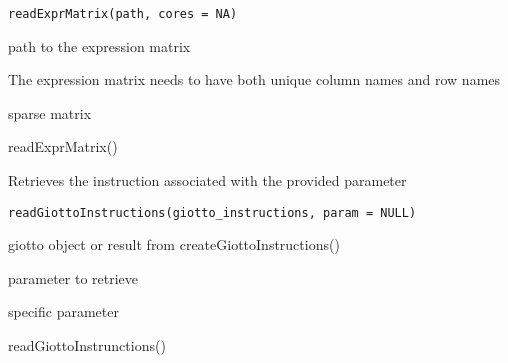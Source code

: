 \documentclass[a4paper]{book}
\begin{document}
%
\begin{Usage}
\begin{verbatim}
readExprMatrix(path, cores = NA)
\end{verbatim}
\end{Usage}
%
\begin{Arguments}
\begin{ldescription}
\item[\code{path}] path to the expression matrix
\end{ldescription}
\end{Arguments}
%
\begin{Details}\relax
The expression matrix needs to have both unique column names and row names
\end{Details}
%
\begin{Value}
sparse matrix
\end{Value}
%
\begin{Examples}
\begin{ExampleCode}
    readExprMatrix()
\end{ExampleCode}
\end{Examples}
%
\begin{Description}\relax
Retrieves the instruction associated with the provided parameter
\end{Description}
%
\begin{Usage}
\begin{verbatim}
readGiottoInstructions(giotto_instructions, param = NULL)
\end{verbatim}
\end{Usage}
%
\begin{Arguments}
\begin{ldescription}
\item[\code{giotto\_instructions}] giotto object or result from createGiottoInstructions()

\item[\code{param}] parameter to retrieve
\end{ldescription}
\end{Arguments}
%
\begin{Value}
specific parameter
\end{Value}
%
\begin{Examples}
\begin{ExampleCode}
    readGiottoInstrunctions()
\end{ExampleCode}
\end{Examples}
\end{document}
